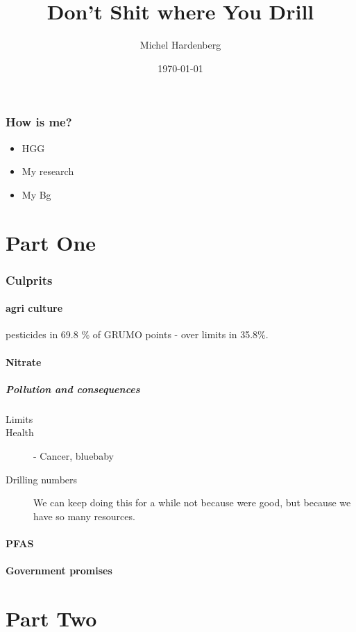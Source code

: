 \documentclass{article}
\title{Don't Shit where You Drill}
\author{Michel Hardenberg}
\date{\today}
\begin{document}
\maketitle

\section{How is me?}
\begin{itemize}
    \item HGG
    \item My research
    \item My Bg
\end{itemize}

\part*{Part One}

\section{Culprits}
\subsection{agri culture}
pesticides in 69.8 \% of GRUMO points - over limits in 35.8\%.

\subsection{Nitrate }
\subsubsection{Pollution and consequences}
\begin{description}
    \item[Limits]
    \item[Health]
        - Cancer, bluebaby
    \item[Drilling numbers]

        We can keep doing this for a while not because were good, but
        because we have so many
        resources.
\end{description}

\subsection{PFAS}

\subsection{Government promises}

\part*{Part Two}



\end{document}
